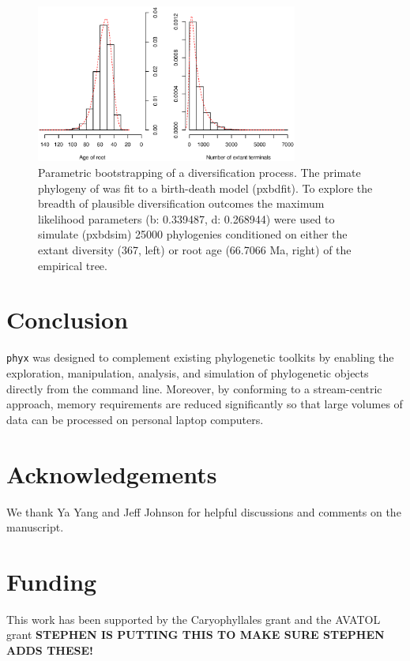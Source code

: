 \documentclass{bioinfo}
\begin{document}
\begin{figure}[!tpb]%
\centerline{\includegraphics[width=86mm]{Fig1.eps}}
\caption{Parametric bootstrapping of a diversification process. The primate phylogeny of \cite{Springer2012} was fit to a birth-death model (pxbdfit). To explore the breadth of plausible diversification outcomes the maximum likelihood parameters (b: 0.339487, d: 0.268944) were used to simulate (pxbdsim) 25000 phylogenies conditioned on either the extant diversity (367, left) or root age (66.7066 Ma, right) of the empirical tree.}\label{fig:01}
\end{figure}


\section{Conclusion}

\texttt{phyx} was designed to complement existing phylogenetic toolkits by
enabling the exploration, manipulation, analysis, and simulation of
phylogenetic objects directly from the command line. Moreover, by conforming
to a stream-centric approach, memory requirements are reduced significantly so that large volumes of data can be processed on personal laptop
computers. \vspace*{-10pt}

\section*{Acknowledgements}

We thank Ya Yang and Jeff Johnson for helpful discussions and comments on the manuscript.\vspace*{-12pt}

\section*{Funding}

This work has been supported by the Caryophyllales grant and the AVATOL grant \textbf{STEPHEN IS PUTTING THIS TO MAKE SURE STEPHEN ADDS THESE!}\vspace*{-12pt}


%
%
%
%
%
%

\end{document}
